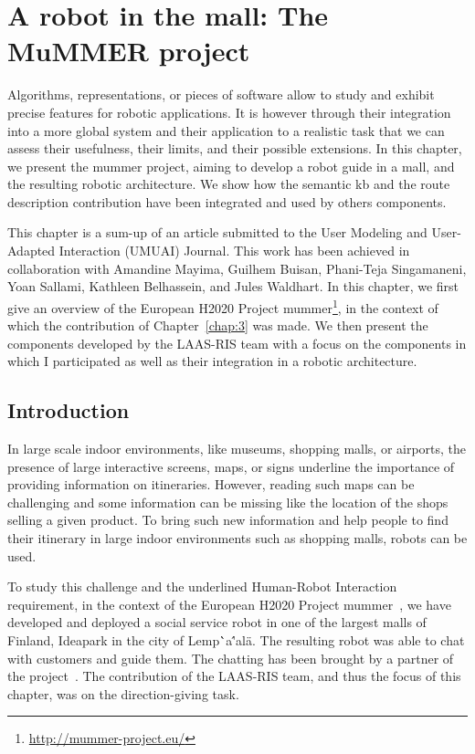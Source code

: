 \ifdefined{}
\else
\setcounter{chapter}{8} %
\dominitoc
\faketableofcontents
\fi

\chapter{A robot in the mall: The MuMMER project}
\minitoc
\label{chap:8}

Algorithms, representations, or pieces of software allow to study and exhibit precise features for robotic applications. It is however through their integration into a more global system and their application to a realistic task that we can assess their usefulness, their limits, and their possible extensions. In this chapter, we present the \acrshort{mummer} project, aiming to develop a robot guide in a mall, and the resulting robotic architecture. We show how the semantic \acrfull{kb} and the route description contribution have been integrated and used by others components.

This chapter is a sum-up of an article submitted to the  User Modeling and User-Adapted Interaction (UMUAI) Journal. This work has been achieved in collaboration with Amandine Mayima, Guilhem Buisan, Phani-Teja Singamaneni, Yoan Sallami, Kathleen Belhassein, and Jules Waldhart. In this chapter, we first give an overview of the European H2020 Project \acrfull{mummer}\footnote{\url{http://mummer-project.eu/}}, in the context of which the contribution of Chapter~\ref{chap:3} was made. We then present the components developed by the LAAS-RIS team with a focus on the components in which I participated as well as their integration in a robotic architecture.

\section{Introduction}

In large scale indoor environments, like museums, shopping malls, or airports, the presence of large interactive screens, maps, or signs underline the importance of providing information on itineraries. However, reading such maps can be challenging and some information can be missing like the location of the shops selling a given product. To bring such new information and help people to find their itinerary in large indoor environments such as shopping malls, robots can be used.

To study this challenge and the underlined Human-Robot Interaction requirement, in the context of the European H2020 Project \acrshort{mummer}~\cite{foster_2016_mummer}, we have developed and deployed a social service robot in one of the largest malls of Finland, Ideapark in the city of Lemp\``a\''al\"a. The resulting robot was able to chat with customers and guide them. The chatting has been brought by a partner of the project~\cite{papaioannou_2018_human}. The contribution of the LAAS-RIS team, and thus the focus of this chapter, was on the direction-giving task.


